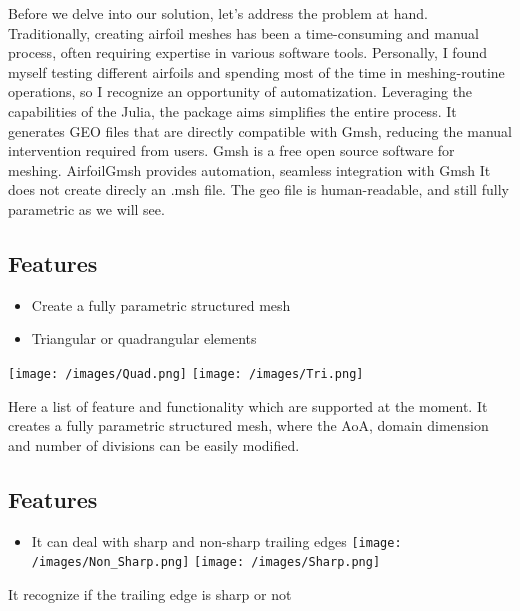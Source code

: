 \documentclass[
  letterpaper,
  DIV=11,
  numbers=noendperiod,
  oneside]{scrartcl}
\providecommand{\tightlist}{%
  \setlength{\itemsep}{0pt}\setlength{\parskip}{0pt}}\usepackage{longtable,booktabs,array}
\begin{document}
Before we delve into our solution, let's address the problem at hand.
Traditionally, creating airfoil meshes has been a time-consuming and
manual process, often requiring expertise in various software tools.
Personally, I found myself testing different airfoils and spending most
of the time in meshing-routine operations, so I recognize an opportunity
of automatization. Leveraging the capabilities of the Julia, the package
aims simplifies the entire process. It generates GEO files that are
directly compatible with Gmsh, reducing the manual intervention required
from users. Gmsh is a free open source software for meshing. AirfoilGmsh
provides automation, seamless integration with Gmsh It does not create
direcly an .msh file. The geo file is human-readable, and still fully
parametric as we will see.

\hypertarget{features}{%
\subsection{Features}\label{features}}

\begin{itemize}
\tightlist
\item
  Create a fully parametric structured mesh
\item
  Triangular or quadrangular elements
\end{itemize}

\texttt{[image: /images/Quad.png]}
\texttt{[image: /images/Tri.png]}

Here a list of feature and functionality which are supported at the
moment. It creates a fully parametric structured mesh, where the AoA,
domain dimension and number of divisions can be easily modified.

\hypertarget{features-1}{%
\subsection{Features}\label{features-1}}

\begin{itemize}
\tightlist
\item
  It can deal with sharp and non-sharp trailing edges
  \texttt{[image: /images/Non\_Sharp.png]}
  \texttt{[image: /images/Sharp.png]}
\end{itemize}

It recognize if the trailing edge is sharp or not
\end{document}
